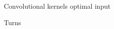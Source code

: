 \documentclass[a4paper,12pt,sort&compress]{article}
\begin{document}
\begin{figure}
    \centering
    \caption{Convolutional kernels optimal input}
    \label{fig:conv_kernels_best}
\end{figure}

\begin{figure}
    \centering
    \caption{Turns}
    \label{fig:turns}
\end{figure}
\end{document}
